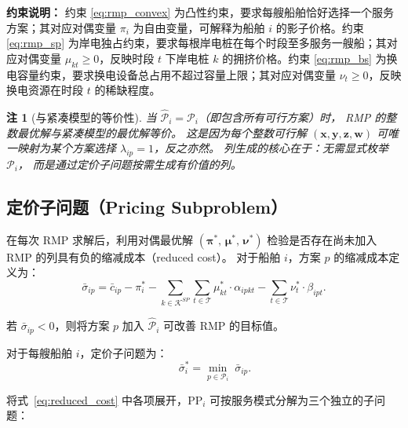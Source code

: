 \documentclass[UTF8, a4paper, 12pt]{ctexart}
\newtheorem{remark}{注}
\begin{document}
\noindent\textbf{约束说明：}
约束 \eqref{eq:rmp_convex} 为凸性约束，要求每艘船舶恰好选择一个服务方案；其对应对偶变量 $\pi_i$ 为自由变量，可解释为船舶 $i$ 的影子价格。约束 \eqref{eq:rmp_sp} 为岸电独占约束，要求每根岸电桩在每个时段至多服务一艘船；其对应对偶变量 $\mu_{kt} \ge 0$，反映时段 $t$ 下岸电桩 $k$ 的拥挤价格。约束 \eqref{eq:rmp_bs} 为换电容量约束，要求换电设备总占用不超过容量上限；其对应对偶变量 $\nu_t \ge 0$，反映换电资源在时段 $t$ 的稀缺程度。

\begin{remark}[与紧凑模型的等价性]
当 $\hat{\mathcal{P}}_i = \mathcal{P}_i$（即包含所有可行方案）时，
RMP 的整数最优解与紧凑模型的最优解等价。
这是因为每个整数可行解
$(\mathbf{x}, \mathbf{y}, \mathbf{z}, \mathbf{w})$
可唯一映射为某个方案选择 $\lambda_{ip} = 1$，反之亦然。
列生成的核心在于：无需显式枚举 $\mathcal{P}_i$，
而是通过定价子问题按需生成有价值的列。
\end{remark}

\subsection{定价子问题（Pricing Subproblem）}
\label{sec:cg_pricing}

在每次 RMP 求解后，利用对偶最优解 $(\boldsymbol{\pi}^*,\, \boldsymbol{\mu}^*,\, \boldsymbol{\nu}^*)$
检验是否存在尚未加入 RMP 的列具有负的缩减成本（reduced cost）。
对于船舶 $i$，方案 $p$ 的缩减成本定义为：
\begin{equation}
  \bar{\sigma}_{ip}
  = \bar{c}_{ip}
  - \pi_i^*
  - \sum_{k \in \mathcal{K}^{SP}} \sum_{t \in \mathcal{T}}
    \mu_{kt}^* \cdot \alpha_{ipkt}
  - \sum_{t \in \mathcal{T}} \nu_t^* \cdot \beta_{ipt}.
  \label{eq:reduced_cost}
\end{equation}

\noindent
若 $\bar{\sigma}_{ip} < 0$，则将方案 $p$ 加入 $\hat{\mathcal{P}}_i$
可改善 RMP 的目标值。

对于每艘船舶 $i$，定价子问题为：
\begin{equation}
  [\text{PP}_i] \qquad
  \bar{\sigma}_i^* =
  \min_{p \in \mathcal{P}_i} \; \bar{\sigma}_{ip}.
  \label{eq:pricing}
\end{equation}

\noindent
将式~\eqref{eq:reduced_cost} 中各项展开，$\text{PP}_i$ 可按服务模式分解为三个独立的子问题：
\end{document}
